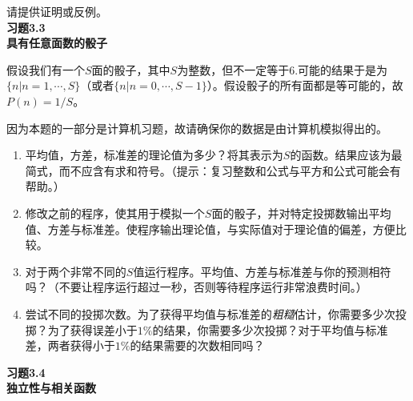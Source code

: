\documentclass[UTF8]{ctexart}
\numberwithin{equation}{section}%
\numberwithin{figure}{section}%
\begin{document}
    请提供证明或反例。\\
    \textbf{习题3.3}\label{prob3.3}\\
    \textbf{具有任意面数的骰子}

    假设我们有一个$S$面的骰子，其中$S$为整数，但不一定等于6.可能的结果于是为$\{n|n=1,\cdots,S\}$（或者$\{n|n=0,\cdots,S-1\}$）。假设骰子的所有面都是等可能的，故$P(n)=1/S$。

    因为本题的一部分是计算机习题，故请确保你的数据是由计算机模拟得出的。
    \begin{enumerate}
        \item 平均值，方差，标准差的理论值为多少？将其表示为$S$的函数。结果应该为最简式，而不应含有求和符号。（提示：复习整数和公式与平方和公式可能会有帮助。）
        \item 修改之前的程序，使其用于模拟一个$S$面的骰子，并对特定投掷数输出平均值、方差与标准差。使程序输出理论值，与实际值对于理论值的偏差，方便比较。
        \item 对于两个非常不同的$S$值运行程序。平均值、方差与标准差与你的预测相符吗？（不要让程序运行超过一秒，否则等待程序运行非常浪费时间。）
        \item 尝试不同的投掷次数。为了获得平均值与标准差的\textit{粗糙}估计，你需要多少次投掷？为了获得误差小于$1\%$的结果，你需要多少次投掷？对于平均值与标准差，两者获得小于$1\%$的结果需要的次数相同吗？
    \end{enumerate}
    \textbf{习题3.4}\label{prob3.4}\\
    \textbf{独立性与相关函数}
\end{document}

